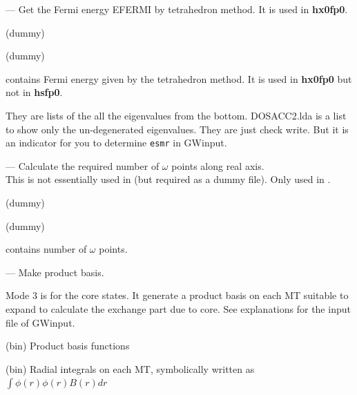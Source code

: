 --- Get the Fermi energy {\sf EFERMI} by tetrahedron method. It is used in {\bf hx0fp0}.

\infiles




 (dummy)

 (dummy) 



\outfiles

 contains Fermi energy given by the tetrahedron method. 
It is used in {\bf hx0fp0} but not in {\bf hsfp0}.


 They are lists of the all the eigenvalues from the bottom.
{\sf DOSACC2.lda} is a list to show only the un-degenerated eigenvalues.
They are just check write. But it is an indicator for you to determine \verb#esmr#
in {\sf GWinput}.

--- Calculate the required number of $\omega$ points along real axis.\\
This  is not essentially used in  (but required as a dummy file). 
Only used in .

\infiles



 (dummy)

 (dummy) 

\outfiles

 contains number of $\omega$ points.


--- Make product basis.

Mode 3 is for the core states. 
It generate a product basis on each MT
suitable to expand to calculate the exchange part due to core.
See explanations for the input file of {\sf GWinput}.

\infiles




\outfiles

(bin) Product basis functions

(bin) Radial integrals on each MT, symbolically written as 
$\int \phi(r) \phi(r) B(r) dr$


